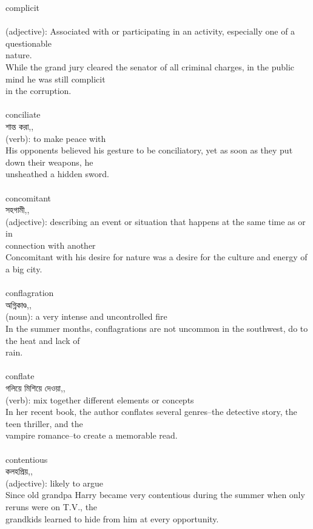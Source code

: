 \documentclass{article}
\begin{document}
{complicit}\\
{}\\
{(adjective): Associated with or participating in an activity, especially one of a questionable\\nature.\\While the grand jury cleared the senator of all criminal charges, in the public mind he was still complicit\\in the corruption.\\}\\
{conciliate}\\
{শান্ত করা,,}\\
{(verb): to make peace with\\His opponents believed his gesture to be conciliatory, yet as soon as they put down their weapons, he\\unsheathed a hidden sword.\\}\\
{concomitant}\\
{সহগামী,,}\\
{(adjective): describing an event or situation that happens at the same time as or in\\connection with another\\Concomitant with his desire for nature was a desire for the culture and energy of a big city.\\}\\
{conflagration}\\
{অগ্নিকাণ্ড,,}\\
{(noun): a very intense and uncontrolled fire\\In the summer months, conflagrations are not uncommon in the southwest, do to the heat and lack of\\rain.\\}\\
{conflate}\\
{গলিয়ে মিশিয়ে দেওয়া,,}\\
{(verb): mix together different elements or concepts\\In her recent book, the author conflates several genres--the detective story, the teen thriller, and the\\vampire romance--to create a memorable read.\\}\\
{contentious}\\
{কলহপ্রিয়,,}\\
{(adjective): likely to argue\\Since old grandpa Harry became very contentious during the summer when only reruns were on T.V., the\\grandkids learned to hide from him at every opportunity.\\}\\
\end{document}
